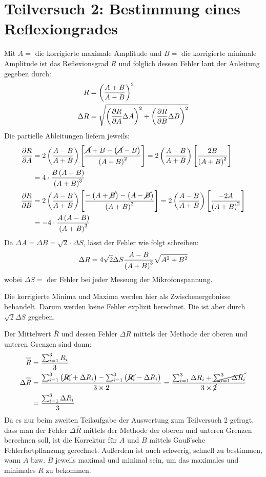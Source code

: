 \section{Teilversuch 2: Bestimmung eines Reflexiongrades}
	Mit $A =$ die korrigierte maximale Amplitude und $B =$ die korrigierte minimale Amplitude ist das Reflexionsgrad $R$ und folglich dessen Fehler laut der Anleitung gegeben durch:
	\begin{align}
		R &= \pbrace{\frac{A+B}{A-B}}^2 \label{eqn:tv2-1} \\
		\Delta R &= \gausserror{R}{A,B}
	\end{align}
	Die partielle Ableitungen liefern jeweils:
	\begin{align}
		\pdv{R}{A} &= 2 \left(\frac{A-B}{A+B}\right)\left[\frac{\cancel{A}+B-\left(\cancel{A}-B\right)}{\left(A+B\right)^2}\right] = 2 \left(\frac{A-B}{A+B}\right) \left[\frac{2B}{\left(A+B\right)^2}\right] \notag \\
		&= 4\cdot \frac{B\left(A-B\right)}{\left(A+B\right)^3} \\
		\pdv{R}{B} &= 2 \left(\frac{A-B}{A+B}\right)\left[\frac{-\left(A+\cancel{B}\right)-\left(A-\cancel{B}\right)}{\left(A+B\right)^2}\right] = 2 \left(\frac{A-B}{A+B}\right) \left[\frac{-2A}{\left(A+B\right)^2}\right] \notag \\
		&= -4\cdot \frac{A\left(A-B\right)}{\left(A+B\right)^3}
	\end{align}
	Da $\Delta A = \Delta B = \sqrt{2}\cdot\Delta S$, lässt der Fehler wie folgt schreiben:
	\begin{equation}
		\Delta R = 4\sqrt{2}\Delta S \frac{A-B}{\left(A+B\right)^3}\sqrt{A^2+B^2} \label{eqn:tv2-2}
	\end{equation}
	wobei $\Delta S =$ der Fehler bei jeder Messung der Mikrofonspannung.

	Die korrigierte Minima und Maxima werden hier als Zwischenergebnisse behandelt. Darum werden keine Fehler explizit berechnet. Die ist aber durch $\sqrt{2}\Delta S$ gegeben.

	Der Mittelwert $\overbar{R}$ und dessen Fehler $\Delta R$ mittels der Methode der oberen und unteren Grenzen sind dann:
	\begin{align}
		\overbar{R} &= \frac{\sum_{i=1}^3 R_i}{3} \label{eqn:tv2-3} \\
		\Delta \overbar{R} &= \frac{\sum_{i=1}^3 \pbrace{\cancel{R_i} + \Delta R_i} - \sum_{i=1}^3 \pbrace{\cancel{R_i} - \Delta R_i}}{3 \times 2}  = \frac{\sum_{i=1}^3 \Delta R_i + \cancel{\sum_{i=1}^3 \Delta R_i}}{3 \times \cancel{2}} \notag \\
		&= \frac{\sum_{i=1}^3 \Delta R_i}{3} \label{eqn:tv2-4}
	\end{align}
	Da es nur beim zweiten Teilaufgabe der Auswertung zum Teilversuch 2 gefragt, dass man der Fehler $\Delta \overbar{R}$ mittels der Methode der oberen und unteren Grenzen berechnen soll, ist die Korrektur für $A$ und $B$ mittels Gauß'sche Fehlerfortpflanzung gerechnet. Außerdem ist auch schwerig, schnell zu bestimmen, wann $A$ bzw. $B$ jeweils maximal und minimal sein, um das maximales und minimales $R$ zu bekommen. 

